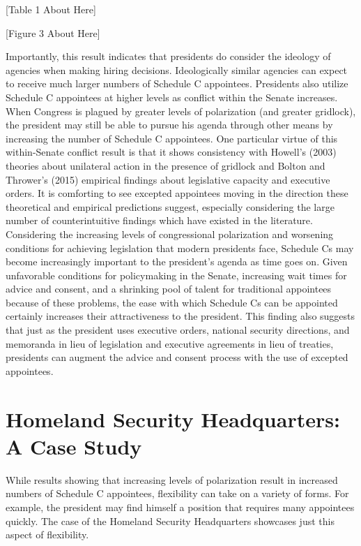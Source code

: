 \documentclass[12pt]{article}
\begin{document}
\begin{center}[Table 1 About Here]\end{center}
\begin{center}[Figure 3 About Here]\end{center}

Importantly, this result indicates that presidents do consider the ideology of agencies when making hiring decisions. Ideologically similar agencies can expect to receive much larger numbers of Schedule C appointees. Presidents also utilize Schedule C appointees at higher levels as conflict within the Senate increases. When Congress is plagued by greater levels of polarization (and greater gridlock), the president may still be able to pursue his agenda through other means by increasing the number of Schedule C appointees. One particular virtue of this within-Senate conflict result is that it shows consistency with Howell's (2003) theories about unilateral action in the presence of gridlock and Bolton and Thrower's (2015) empirical findings about legislative capacity and executive orders. It is comforting to see excepted appointees moving in the direction these theoretical and empirical predictions suggest, especially considering the large number of counterintuitive findings which have existed in the literature. Considering the increasing levels of congressional polarization and worsening conditions for achieving legislation that modern presidents face, Schedule Cs may become increasingly important to the president's agenda as time goes on. Given unfavorable conditions for policymaking in the Senate, increasing wait times for advice and consent, and a shrinking pool of talent for traditional appointees because of these problems, the ease with which Schedule Cs can be appointed certainly increases their attractiveness to the president. This finding also suggests that just as the president uses executive orders, national security directions, and memoranda in lieu of legislation and executive agreements in lieu of treaties, presidents can augment the advice and consent process with the use of excepted appointees.

\section*{Homeland Security Headquarters: A Case Study}
While results showing that increasing levels of polarization result in increased numbers of Schedule C appointees, flexibility can take on a variety of forms. For example, the president may find himself a position that requires many appointees quickly. The case of the Homeland Security Headquarters showcases just this aspect of flexibility. 
\end{document}
